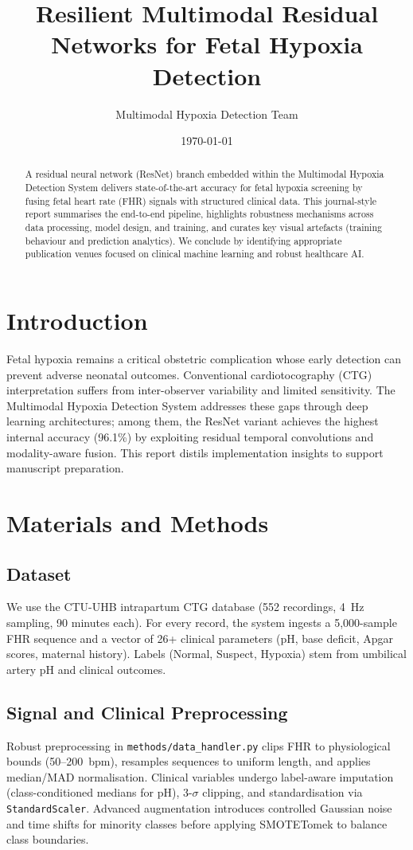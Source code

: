 \documentclass[12pt,a4paper]{article}
\title{Resilient Multimodal Residual Networks for Fetal Hypoxia Detection}
\author{Multimodal Hypoxia Detection Team}
\date{\today}
\begin{document}
\maketitle

\begin{abstract}
A residual neural network (ResNet) branch embedded within the Multimodal Hypoxia Detection System delivers state-of-the-art accuracy for fetal hypoxia screening by fusing fetal heart rate (FHR) signals with structured clinical data. This journal-style report summarises the end-to-end pipeline, highlights robustness mechanisms across data processing, model design, and training, and curates key visual artefacts (training behaviour and prediction analytics). We conclude by identifying appropriate publication venues focused on clinical machine learning and robust healthcare AI.
\end{abstract}

\section{Introduction}
Fetal hypoxia remains a critical obstetric complication whose early detection can prevent adverse neonatal outcomes. Conventional cardiotocography (CTG) interpretation suffers from inter-observer variability and limited sensitivity. The Multimodal Hypoxia Detection System addresses these gaps through deep learning architectures; among them, the ResNet variant achieves the highest internal accuracy (96.1\%) by exploiting residual temporal convolutions and modality-aware fusion. This report distils implementation insights to support manuscript preparation.

\section{Materials and Methods}
\subsection{Dataset}
We use the CTU-UHB intrapartum CTG database (552 recordings, 4~Hz sampling, 90 minutes each). For every record, the system ingests a 5{,}000-sample FHR sequence and a vector of 26+ clinical parameters (pH, base deficit, Apgar scores, maternal history). Labels (Normal, Suspect, Hypoxia) stem from umbilical artery pH and clinical outcomes.

\subsection{Signal and Clinical Preprocessing}
Robust preprocessing in \texttt{methods/data\_handler.py} clips FHR to physiological bounds (50--200~bpm), resamples sequences to uniform length, and applies median/MAD normalisation. Clinical variables undergo label-aware imputation (class-conditioned medians for pH), 3-$\sigma$ clipping, and standardisation via \texttt{StandardScaler}. Advanced augmentation introduces controlled Gaussian noise and time shifts for minority classes before applying SMOTETomek to balance class boundaries.
\end{document}
